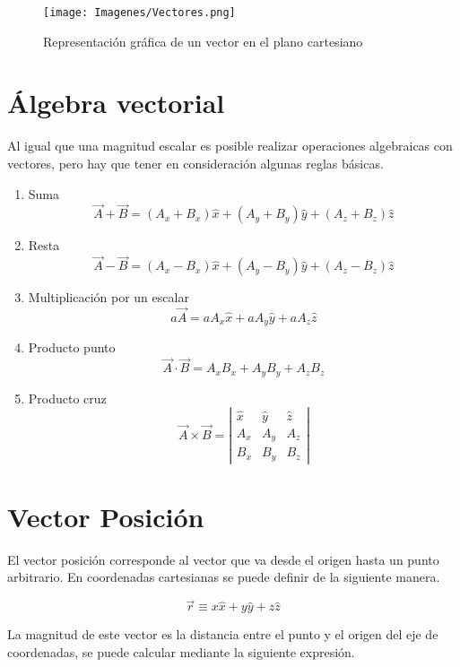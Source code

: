 \documentclass[12pt,letterpaper]{article}
\numberwithin{equation}{section}
\begin{document}
\begin{figure}[h!]
	\centering\texttt{[image: Imagenes/Vectores.png]}
	\caption{Representación gráfica de un vector en el plano cartesiano}
	\label{Fig:Vectores}
\end{figure}

\section*{Álgebra vectorial}
Al igual que una magnitud escalar es posible realizar operaciones algebraicas con vectores, pero hay que tener en consideración algunas reglas básicas. 

\begin{enumerate}
	\item Suma
	$$\vec{A}+\vec{B}=(A_x+B_x)\hat{x}+(A_y+B_y)\hat{y}+(A_z+B_z)\hat{z}$$
	
	\item Resta
	$$\vec{A}-\vec{B}=(A_x-B_x)\hat{x}+(A_y-B_y)\hat{y}+(A_z-B_z)\hat{z}$$
	
	\item Multiplicación por un escalar
	$$a\vec{A}=aA_x\hat{x}+aA_y\hat{y}+aA_z\hat{z}$$
	
	\item Producto punto
	$$\vec{A}\cdot\vec{B}=A_xB_x+A_yB_y+A_zB_z$$
	
	\item Producto cruz
	$$\vec{A}\times\vec{B}=\left | \begin{array}{ccc}
	\hat{x} & \hat{y} & \hat{z}\\
	A_x & A_y & A_z\\
	B_x & B_y & B_z  \end{array} \right |$$
	
\end{enumerate}

\section*{Vector Posición}
El vector posición corresponde al vector que va desde el origen hasta un punto arbitrario. En coordenadas cartesianas se puede definir de la siguiente manera.

$$\vec{r}\equiv x\hat{x}+y\hat{y}+z\hat{z}$$

\noindent La magnitud de este vector es la distancia entre el punto y el origen del eje de coordenadas, se puede calcular mediante la siguiente expresión.
\end{document}

